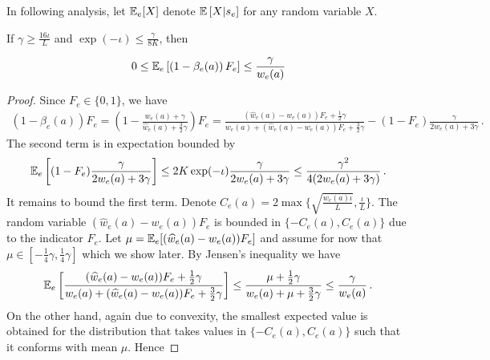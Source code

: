 In following analysis, let $\mathbb{E}_e[X]$ denote $\mathbb{E}\left[ X | s_e \right]$ for any random variable $X$.

\begin{lemma}
\label{lem: bounding_1_minus_beta}
If $\gamma \geq \frac{16 \iota}{L}$ and $\exp (-\iota) \le \frac{\gamma}{8 K}$, then

$$
0 \le \mathbb{E}_e\left[\left(1-\beta_e(a)\right) F_e\right] \le \frac{\gamma}{w_{e}(a)}
$$

\end{lemma}
\begin{proof}
Since $F_e\in\{0,1\}$, we have
\begin{align*}
    (1-\beta_{e}(a))F_e = \left(1-\frac{w_{e}(a)+\gamma}{\widehat{w}_{e}(a)+\frac{3}{2}\gamma}\right)F_e = \frac{(\widehat{w}_{e}(a)-w_{e}(a))F_e +\frac{1}{2}\gamma}{w_{e}(a)+(\widehat{w}_{e}(a)-w_{e}(a))F_e+\frac{3}{2}\gamma} - (1-F_e)\frac{\gamma}{2w_{e}(a)+3\gamma}\,.
\end{align*}
The second term is in expectation bounded by
\begin{align*}
    \mathbb{E}_{e}\left[(1-F_e)\frac{\gamma}{2w_{e}(a)+3\gamma}\right]
    \le 2K\exp(-\iota)\frac{\gamma}{2w_{e}(a)+3\gamma}\le \frac{\gamma^2}{4(2w_{e}(a)+3\gamma)}\,.
\end{align*}
It remains to bound the first term. Denote $C_{e}(a)=2\max\{\sqrt{\frac{w_{e}(a)\iota}{L}},\frac{\iota}{L}\}$. The random variable $(\widehat{w}_{e}(a)-w_{e}(a))F_e$ is bounded in $\{-C_{e}(a),C_{e}(a)\}$ due to the indicator $F_e$.
Let $\mu=\mathbb{E}_{e}[(\widehat{w}_{e}(a)-w_{e}(a))F_e]$ and assume for now that $\mu\in[-\frac{1}{4}\gamma,\frac{1}{4}\gamma]$ which we show later. By Jensen's inequality we have
\begin{align*}
    \mathbb{E}_{e}\left[\frac{(\widehat{w}_{e}(a)-w_{e}(a))F_e +\frac{1}{2}\gamma}{w_{e}(a)+(\widehat{w}_{e}(a)-w_{e}(a))F_e+\frac{3}{2}\gamma}\right] \le \frac{\mu+\frac{1}{2}\gamma}{w_{e}(a)+\mu+\frac{3}{2}\gamma}\le \frac{\gamma}{w_{e}(a)}\,.
\end{align*}
On the other hand, again due to convexity, the smallest expected value is obtained for the distribution that takes values in $\{-C_{e}(a),C_{e}(a)\}$ such that it conforms with mean $\mu$. Hence


\end{proof}
